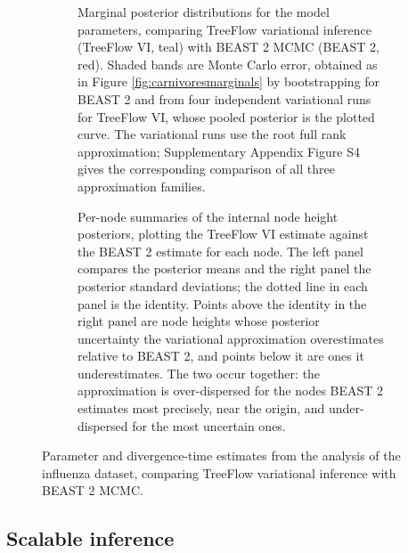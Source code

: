 \begin{figure}
    \centering
    \begin{subfigure}[b]{\linewidth}
        \caption{Marginal posterior distributions for the model parameters, comparing TreeFlow variational inference (TreeFlow VI, teal) with BEAST 2 MCMC (BEAST 2, red). Shaded bands are Monte Carlo error, obtained as in Figure \ref{fig:carnivoresmarginals} by bootstrapping for BEAST 2 and from four independent variational runs for TreeFlow VI, whose pooled posterior is the plotted curve. The variational runs use the root full rank approximation; Supplementary Appendix Figure S4 gives the corresponding comparison of all three approximation families.}
        \label{fig:flumarginals}
    \end{subfigure}

    \begin{subfigure}[b]{\linewidth}
        \caption{Per-node summaries of the internal node height posteriors, plotting the TreeFlow VI estimate against the BEAST 2 estimate for each node. The left panel compares the posterior means and the right panel the posterior standard deviations; the dotted line in each panel is the identity. Points above the identity in the right panel are node heights whose posterior uncertainty the variational approximation overestimates relative to BEAST 2, and points below it are ones it underestimates. The two occur together: the approximation is over-dispersed for the nodes BEAST 2 estimates most precisely, near the origin, and under-dispersed for the most uncertain ones.}
        \label{fig:flutree}
    \end{subfigure}

    \caption{Parameter and divergence-time estimates from the analysis of the influenza dataset, comparing TreeFlow variational inference with BEAST 2 MCMC.}
\end{figure}

\subsection{Scalable inference}

